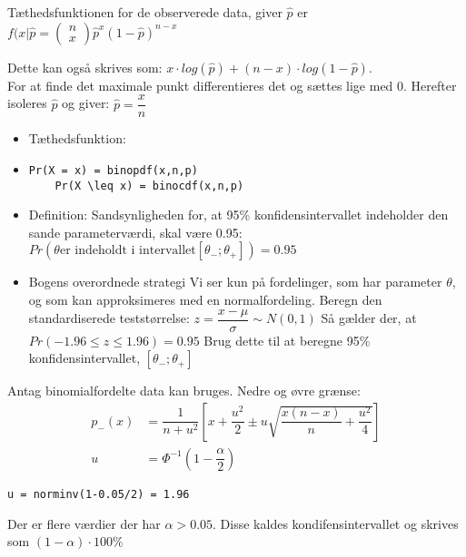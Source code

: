 \documentclass[Main]{subfiles}
\begin{document}
\begin{theo}
Tæthedsfunktionen for de observerede data, giver $\hat{p}$ er $f(x|\hat{p} = \left(\begin{matrix}
	n\\
	x
	\end{matrix}\right) \hat{p}^x (1-\hat{p})^{n-x}$

Dette kan også skrives som:
$x \cdot log(\hat{p}) + (n-x) \cdot log(1-\hat{p})$.
\\
For at finde det maximale punkt differentieres det og sættes lige med 0. 
Herefter isoleres $\hat{p}$ og giver:
$\hat{p} = \dfrac{x}{n}$
\end{theo}



\begin{theo}
\begin{itemize}
	\item Tæthedsfunktion:
	\item[] \begin{lstlisting}[style=Code-Matlab]
	Pr(X = x) = binopdf(x,n,p)
	Pr(X \leq x) = binocdf(x,n,p)
	\end{lstlisting}
\end{itemize}
\end{theo}



\begin{theo}[95\% konfidensinterval]

\begin{itemize}
	\item Definition:
\subitem Sandsynligheden for, at 95\% konfidensintervallet indeholder den sande parameterværdi, skal være 0.95:
$Pr(\theta \text{er indeholdt i intervallet} [\theta_- ; \theta_+]) = 0.95$
\item Bogens overordnede strategi
\subitem Vi ser kun på fordelinger, som har parameter $\theta$, og som kan approksimeres med en normalfordeling.
\subitem Beregn den standardiserede teststørrelse: $z= \dfrac{x-\mu}{\sigma} \sim N(0,1)$
Så gælder der, at $Pr(-1.96 \leq z \leq 1.96) = 0.95$
\subitem Brug dette til at beregne 95\% konfidensintervallet, $[\theta_- ; \theta_+]$
\end{itemize}

Antag binomialfordelte data kan bruges.
Nedre og øvre grænse:
\begin{align*}
p_-(x) &= \dfrac{1}{n+u^2} \left[x+\dfrac{u^2}{2}\pm u \sqrt{\dfrac{x(n-x)}{n} + \dfrac{u^2}{4}}\right]\\
u &= \Phi^{-1}(1- \dfrac{\alpha}{2})
\end{align*}
\begin{lstlisting}[style=Code-Matlab]
u = norminv(1-0.05/2) = 1.96
\end{lstlisting}

Der er flere værdier der har $\alpha > 0.05$.
Disse kaldes kondifensintervallet og skrives som $(1-\alpha) \cdot 100\% $

\end{theo}
\end{document}
